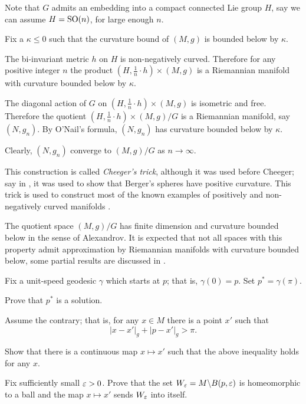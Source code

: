 Note that $G$ admits an embedding into a compact connected Lie group $H$, say we can assume $H=\mathrm{SO}(n)$, for large enough $n$.

Fix a $\kappa\le 0$ such that the curvature bound of $(M,g)$ is bounded below by $\kappa$.

The bi-invariant metric $h$ on $H$ is non-negatively curved.
Therefore for any positive integer $n$ the product $(H,\tfrac1n\cdot h)\times (M,g)$ is a Riemannian manifold with  curvature bounded below by $\kappa$.

The diagonal action of $G$ on $(H,\tfrac1n\cdot h)\times (M,g)$ is        isometric and free. 
Therefore 
the quotient $(H,\tfrac1n\cdot h)\times (M,g)/G$
is a Riemannian manifold, say $(N,g_n)$.
By O'Nail's formula, $(N,g_n)$ has curvature bounded below by $\kappa$.

Clearly, $(N,g_n)$ converge to $(M,g)/G$ as $n\to \infty$.\qeds

This construction is called \emph{Cheeger's trick},
although it was used before Cheeger;
say in \cite{GKM}, it was used to show that Berger's spheres have positive curvature.
This trick is used to construct most of the known examples of positively and non-negatively curved manifolds
 \cite[see][]{cheeger,aloff-wallach,gromoll-meyer,eschenburg-spaces,bazajkin}.
 
The quotient space  $(M,g)/G$ has finite dimension and curvature bounded below in the sense of Alexandrov. 
It is expected that not all spaces with this property admit approximation by Riemannian manifolds with curvature bounded below,
some partial results are discussed in \cite{pwz,kapovitch}.








Fix a unit-speed geodesic $\gamma$ which starts at $p$;
that is, $\gamma(0)=p$.
Set $p^*=\gamma(\pi)$.

Prove that $p^*$ is a solution.\qeds

Assume the contrary;
that is, for any $x\in M$ there is a point $x'$ such that 
\[|x-x'|_g+|p-x'|_g>\pi.\]

Show that there is a continuous map $x\mapsto x'$
such that the above inequality holds for any $x$.

Fix sufficiently small $\varepsilon>0$.
Prove that the set $W_\varepsilon=M\backslash B(p,\varepsilon)$ 
is homeomorphic to a ball 
and the map $x\mapsto x'$ sends $W_\varepsilon$ into itself.

